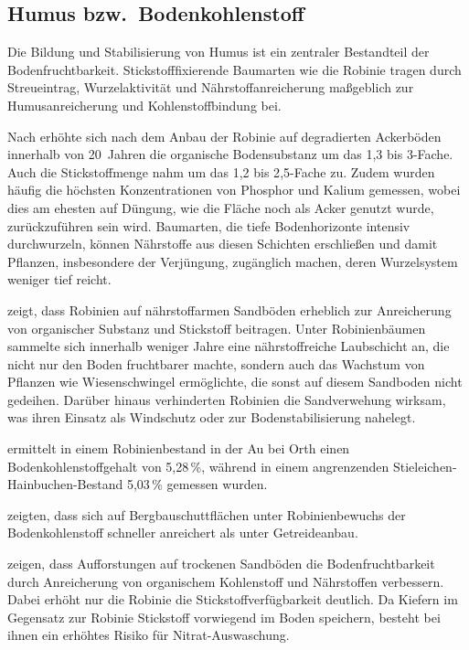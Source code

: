 \documentclass[twocolumn]{scrartcl}
\begin{document}
\subsection{Humus bzw.\ Bodenkohlenstoff}

Die Bildung und Stabilisierung von Humus ist ein zentraler Bestandteil der Bodenfruchtbarkeit. Stickstofffixierende Baumarten wie die Robinie tragen durch Streueintrag, Wurzelaktivität und Nährstoffanreicherung maßgeblich zur Humusanreicherung und Kohlenstoffbindung bei.

Nach \citet{papaioannou2016robinieBoden} erhöhte sich nach dem Anbau der Robinie auf degradierten Ackerböden innerhalb von 20~Jahren die organische Bodensubstanz um das 1{,}3 bis 3-Fache. Auch die Stickstoffmenge nahm um das 1{,}2 bis 2{,}5-Fache zu. Zudem wurden häufig die höchsten Konzentrationen von Phosphor und Kalium gemessen, wobei dies am ehesten auf Düngung, wie die Fläche noch als Acker genutzt wurde, zurückzuführen sein wird. Baumarten, die tiefe Bodenhorizonte intensiv durchwurzeln, können Nährstoffe aus diesen Schichten erschließen und damit Pflanzen, insbesondere der Verjüngung, zugänglich machen, deren Wurzelsystem weniger tief reicht.

\citet{gustafson1935robinie} zeigt, dass Robinien auf nährstoffarmen Sandböden erheblich zur Anreicherung von organischer Substanz und Stickstoff beitragen. Unter Robinienbäumen sammelte sich innerhalb weniger Jahre eine nährstoffreiche Laubschicht an, die nicht nur den Boden fruchtbarer machte, sondern auch das Wachstum von Pflanzen wie Wiesenschwingel ermöglichte, die sonst auf diesem Sandboden nicht gedeihen. Darüber hinaus verhinderten Robinien die Sandverwehung wirksam, was ihren Einsatz als Windschutz oder zur Bodenstabilisierung nahelegt.

\citet{kastler2013robinieBoden} ermittelt in einem Robinienbestand in der Au bei Orth einen Bodenkohlenstoffgehalt von 5{,}28\,\%, während in einem angrenzenden Stieleichen-Hainbuchen-Bestand 5{,}03\,\% gemessen wurden.

\citet{kanzler2021robinieBodenc} zeigten, dass sich auf Bergbauschuttflächen unter Robinienbewuchs der Bodenkohlenstoff schneller anreichert als unter Getreideanbau.

\citet{gurlevik2016longterm} zeigen, dass Aufforstungen auf trockenen Sandböden die Bodenfruchtbarkeit durch Anreicherung von organischem Kohlenstoff und Nährstoffen verbessern. Dabei erhöht nur die Robinie die Stickstoffverfügbarkeit deutlich. Da Kiefern im Gegensatz zur Robinie Stickstoff vorwiegend im Boden speichern, besteht bei ihnen ein erhöhtes Risiko für Nitrat-Auswaschung.
\end{document}
